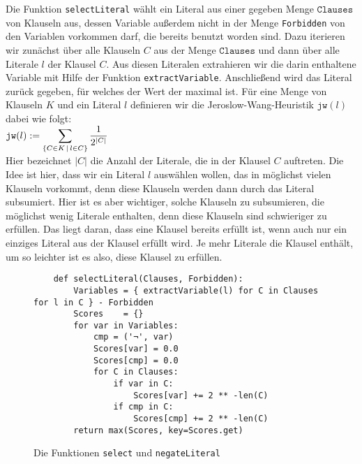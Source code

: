 Die Funktion \texttt{selectLiteral} wählt ein Literal aus 
einer gegeben Menge $\texttt{Clauses}$ von Klauseln aus, dessen Variable außerdem nicht in der Menge
\texttt{Forbidden} von den Variablen vorkommen darf, die bereits benutzt worden sind.
Dazu iterieren wir zunächst über alle Klauseln $C$ aus der Menge $\texttt{Clauses}$ und dann über alle Literale $l$
der Klausel $C$.  Aus diesen Literalen extrahieren wir die darin enthaltene Variable mit Hilfe der Funktion
\texttt{extractVariable}.  Anschließend wird das Literal zurück gegeben, für welches der Wert der
  \cite{jeroslow:1990} maximal ist.  Für eine
Menge von Klauseln $K$ und ein 
Literal $l$ definieren wir die Jeroslow-Wang-Heuristik $\texttt{jw}(l)$ dabei wie folgt:
\\[0.2cm]
\hspace*{1.3cm}
$\displaystyle\mathtt{jw}(l) := \sum\limits_{\{C \in K \,\mid\, l \in C\}} \frac{1}{2^{|C|}}$
\\[0.2cm]
Hier bezeichnet $|C|$ die Anzahl der Literale, die in der Klausel $C$ auftreten.  Die Idee ist hier, dass wir
ein Literal $l$ auswählen wollen, das in möglichst vielen Klauseln vorkommt, denn diese Klauseln werden dann
durch das Literal subsumiert.  Hier ist es aber wichtiger, solche Klauseln zu subsumieren, die möglichst wenig
Literale enthalten, denn diese Klauseln sind schwieriger zu erfüllen.  Das liegt daran, dass eine Klausel
bereits erfüllt ist, wenn auch nur ein einziges Literal aus der Klausel erfüllt wird.  Je mehr Literale die
Klausel enthält, um so leichter ist es also, diese Klausel zu erfüllen.


\begin{figure}[!ht]
  \centering
\begin{verbatim}
    def selectLiteral(Clauses, Forbidden):
        Variables = { extractVariable(l) for C in Clauses for l in C } - Forbidden
        Scores    = {} 
        for var in Variables:
            cmp = ('¬', var)
            Scores[var] = 0.0
            Scores[cmp] = 0.0
            for C in Clauses:
                if var in C:
                    Scores[var] += 2 ** -len(C)
                if cmp in C: 
                    Scores[cmp] += 2 ** -len(C)
        return max(Scores, key=Scores.get)
\end{verbatim}
\vspace*{-0.3cm}
  \caption{Die Funktionen \texttt{select} und \texttt{negateLiteral}}
  \label{fig:solve-aux}
\end{figure}

